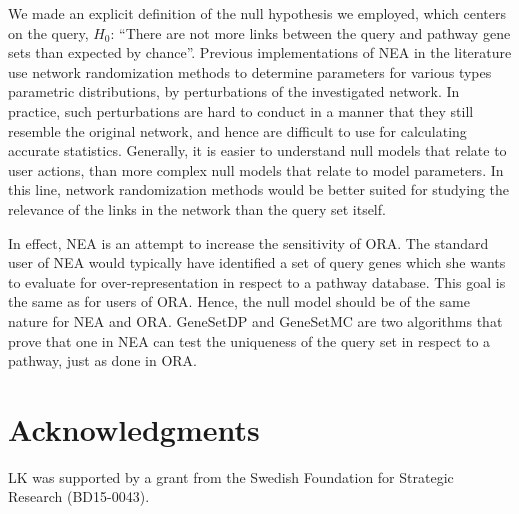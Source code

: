\documentclass[10pt,letterpaper]{article}
\begin{document}
We made an explicit definition of the null hypothesis we employed, which centers on the query, $H_0$: ``There are not more links between the query and pathway gene sets than expected by chance''. Previous implementations of NEA in the literature use network randomization methods to determine parameters for various types parametric distributions, by perturbations of the investigated network. In practice, such perturbations are hard to conduct in a manner that they still resemble the original network, and hence are difficult to use for calculating accurate statistics. Generally, it is easier to understand null models that relate to user actions, than more complex null models that relate to model parameters. 
In this line, network randomization methods would be better suited for studying the relevance of the links in the network than the query set itself.

In effect, NEA is an attempt to increase the sensitivity of ORA. The standard user of NEA would typically have identified a set of query genes which she wants to evaluate for over-representation in respect to a pathway database. This goal is the same as for users of ORA. Hence, the null model should be of the same nature for NEA and ORA. GeneSetDP and GeneSetMC are two algorithms that prove that one in NEA can test the uniqueness of the query set in respect to a pathway, just as done in ORA.

\section*{Acknowledgments}

LK was supported by a grant from the Swedish Foundation for Strategic Research (BD15-0043).


\end{document}
